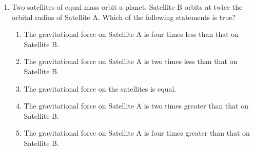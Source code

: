 \documentclass{../../oss-apphys}
\begin{document}
\begin{multicols}{2}
\begin{enumerate}[leftmargin=18pt,resume]
%
  
  \item Two satellites of equal mass orbit a planet. Satellite B orbits at twice
    the orbital radius of Satellite A. Which of the following statements is
    true?
    \begin{enumerate}[noitemsep,topsep=0pt,leftmargin=18pt,label=(\Alph*)]
    \item The gravitational force on Satellite A is four times less than that on
      Satellite B.
    \item The gravitational force on Satellite A is two times less than that on
      Satellite B.
    \item The gravitational force on the satellites is equal.
    \item The gravitational force on Satellite A is two times greater than that
      on Satellite B.
    \item The gravitational force on Satellite A is four times greater than that
      on Satellite B.
    \end{enumerate}

    \columnbreak
    

\end{enumerate}
\end{multicols}
\end{document}
